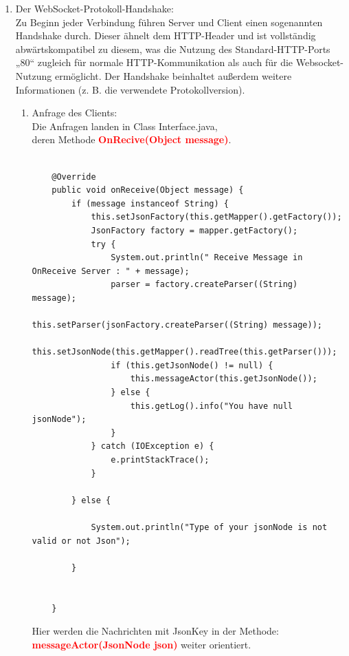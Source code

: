 \begin{itemize}
\begin{enumerate}
\item Der WebSocket-Protokoll-Handshake:\\
Zu Beginn jeder Verbindung führen Server und Client einen sogenannten Handshake durch. Dieser ähnelt dem HTTP-Header und ist vollständig abwärtskompatibel zu diesem, was die Nutzung des Standard-HTTP-Ports „80“ zugleich für normale HTTP-Kommunikation als auch für die Websocket-Nutzung ermöglicht. Der Handshake beinhaltet außerdem weitere Informationen (z. B. die verwendete Protokollversion).
\begin{enumerate}
\item Anfrage des Clients:\\
Die Anfragen landen in Class Interface.java,\\deren Methode \textcolor{red}{\textbf{OnRecive(Object message)}}.\\



\begin{lstlisting}[frame=single]
  
    @Override
    public void onReceive(Object message) {
        if (message instanceof String) {
            this.setJsonFactory(this.getMapper().getFactory());
            JsonFactory factory = mapper.getFactory();
            try {
                System.out.println(" Receive Message in OnReceive Server : " + message);
                parser = factory.createParser((String) message);
                this.setParser(jsonFactory.createParser((String) message));
                this.setJsonNode(this.getMapper().readTree(this.getParser()));
                if (this.getJsonNode() != null) {
                    this.messageActor(this.getJsonNode());
                } else {
                    this.getLog().info("You have null jsonNode");
                }
            } catch (IOException e) {
                e.printStackTrace();
            }

        } else {
           
            System.out.println("Type of your jsonNode is not valid or not Json");

        }


    }
\end{lstlisting}

Hier werden die Nachrichten mit JsonKey in der Methode:\\ \textcolor{red}{\textbf{messageActor(JsonNode json)}} weiter orientiert.\\
\begin{lstlisting}[frame=single]



\end{lstlisting}
\end{enumerate}
\end{enumerate}
\end{itemize}
